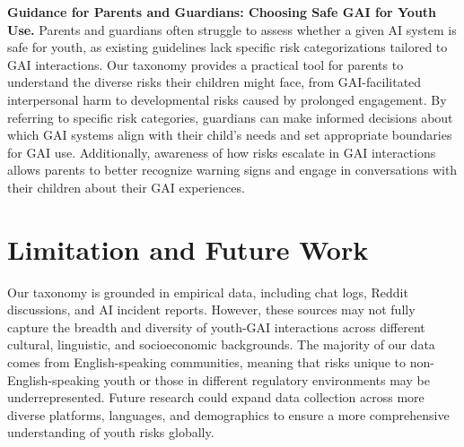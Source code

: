 \textbf{Guidance for Parents and Guardians: Choosing Safe GAI for Youth Use.}  Parents and guardians often struggle to assess whether a given AI system is safe for youth, as existing guidelines lack specific risk categorizations tailored to GAI interactions. Our taxonomy provides a practical tool for parents to understand the diverse risks their children might face, from GAI-facilitated interpersonal harm to developmental risks caused by prolonged engagement. By referring to specific risk categories, guardians can make informed decisions about which GAI systems align with their child's needs and set appropriate boundaries for GAI use. Additionally, awareness of how risks escalate in GAI interactions allows parents to better recognize warning signs and engage in conversations with their children about their GAI experiences.


\vspace{-8pt}
\section{Limitation and Future Work}
\vspace{-8pt}
Our taxonomy is grounded in empirical data, including chat logs, Reddit discussions, and AI incident reports. However, these sources may not fully capture the breadth and diversity of youth-GAI interactions across different cultural, linguistic, and socioeconomic backgrounds. The majority of our data comes from English-speaking communities, meaning that risks unique to non-English-speaking youth or those in different regulatory environments may be underrepresented. Future research could expand data collection across more diverse platforms, languages, and demographics to ensure a more comprehensive understanding of youth risks globally.